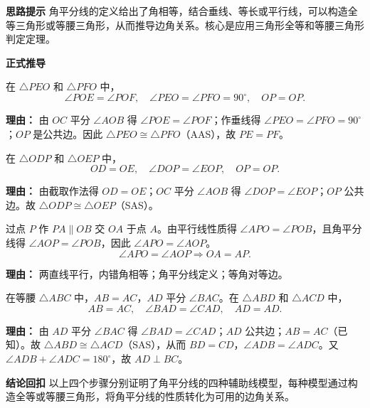 \begin{proofbox}
	\textbf{\textcolor{CProof}{思路提示}}
	角平分线的定义给出了角相等，结合垂线、等长或平行线，可以构造全等三角形或等腰三角形，从而推导边角关系。核心是应用三角形全等和等腰三角形判定定理。

	\medskip
	\textbf{\textcolor{CProof}{正式推导}}
	\begin{description}[style=nextline, leftmargin=2.8em, labelsep=0.5em, itemsep=0.55em]
		\item[\textbf{步骤一（垂两边证明）：}]
			在 $\triangle PEO$ 和 $\triangle PFO$ 中，
			\[
				\angle POE = \angle POF,\quad \angle PEO = \angle PFO = 90^\circ,\quad OP = OP.
			\]
			\par\textbf{理由：} 由 $OC$ 平分 $\angle AOB$ 得 $\angle POE = \angle POF$；作垂线得 $\angle PEO = \angle PFO = 90^\circ$；$OP$ 是公共边。因此 $\triangle PEO \cong \triangle PFO$（AAS），故 $PE = PF$。
		\item[\textbf{步骤二（截等长证明）：}]
			在 $\triangle ODP$ 和 $\triangle OEP$ 中，
			\[
				OD = OE,\quad \angle DOP = \angle EOP,\quad OP = OP.
			\]
			\par\textbf{理由：} 由截取作法得 $OD = OE$；$OC$ 平分 $\angle AOB$ 得 $\angle DOP = \angle EOP$；$OP$ 公共边。故 $\triangle ODP \cong \triangle OEP$（SAS）。
		\item[\textbf{步骤三（作平行证明）：}]
			过点 $P$ 作 $PA \parallel OB$ 交 $OA$ 于点 $A$。由平行线性质得 $\angle APO = \angle POB$，且角平分线得 $\angle AOP = \angle POB$，因此 $\angle APO = \angle AOP$。
			\[
				\angle APO = \angle AOP \Rightarrow OA = AP.
			\]
			\par\textbf{理由：} 两直线平行，内错角相等；角平分线定义；等角对等边。
		\item[\textbf{步骤四（三线合一证明）：}]
			在等腰 $\triangle ABC$ 中，$AB = AC$，$AD$ 平分 $\angle BAC$。在 $\triangle ABD$ 和 $\triangle ACD$ 中，
			\[
				AB = AC,\quad \angle BAD = \angle CAD,\quad AD = AD.
			\]
			\par\textbf{理由：} 由 $AD$ 平分 $\angle BAC$ 得 $\angle BAD = \angle CAD$；$AD$ 公共边；$AB=AC$（已知）。故 $\triangle ABD \cong \triangle ACD$（SAS），从而 $BD = CD$，$\angle ADB = \angle ADC$。又 $\angle ADB + \angle ADC = 180^\circ$，故 $AD \perp BC$。
	\end{description}

	\medskip
	\textbf{\textcolor{CProof}{结论回扣}}
	以上四个步骤分别证明了角平分线的四种辅助线模型，每种模型通过构造全等或等腰三角形，将角平分线的性质转化为可用的边角关系。
\end{proofbox}

